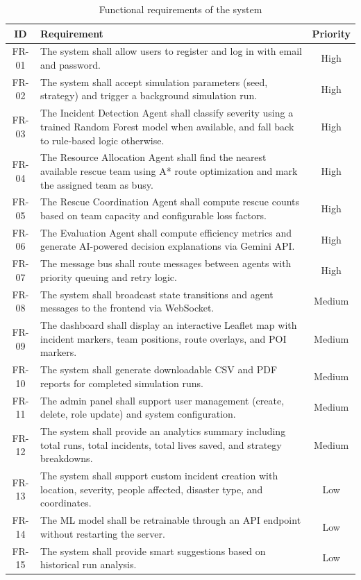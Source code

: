 \begin{table}[H]
\centering
\caption{Functional requirements of the system}
\label{tab:functional_req}
\begin{tabularx}{\textwidth}{|c|X|c|}
\hline
\textbf{ID} & \textbf{Requirement} & \textbf{Priority} \\
\hline
FR-01 & The system shall allow users to register and log in with email and password. & High \\
\hline
FR-02 & The system shall accept simulation parameters (seed, strategy) and trigger a background simulation run. & High \\
\hline
FR-03 & The Incident Detection Agent shall classify severity using a trained Random Forest model when available, and fall back to rule-based logic otherwise. & High \\
\hline
FR-04 & The Resource Allocation Agent shall find the nearest available rescue team using A* route optimization and mark the assigned team as busy. & High \\
\hline
FR-05 & The Rescue Coordination Agent shall compute rescue counts based on team capacity and configurable loss factors. & High \\
\hline
FR-06 & The Evaluation Agent shall compute efficiency metrics and generate AI-powered decision explanations via Gemini API. & High \\
\hline
FR-07 & The message bus shall route messages between agents with priority queuing and retry logic. & High \\
\hline
FR-08 & The system shall broadcast state transitions and agent messages to the frontend via WebSocket. & Medium \\
\hline
FR-09 & The dashboard shall display an interactive Leaflet map with incident markers, team positions, route overlays, and POI markers. & Medium \\
\hline
FR-10 & The system shall generate downloadable CSV and PDF reports for completed simulation runs. & Medium \\
\hline
FR-11 & The admin panel shall support user management (create, delete, role update) and system configuration. & Medium \\
\hline
FR-12 & The system shall provide an analytics summary including total runs, total incidents, total lives saved, and strategy breakdowns. & Medium \\
\hline
FR-13 & The system shall support custom incident creation with location, severity, people affected, disaster type, and coordinates. & Low \\
\hline
FR-14 & The ML model shall be retrainable through an API endpoint without restarting the server. & Low \\
\hline
FR-15 & The system shall provide smart suggestions based on historical run analysis. & Low \\
\hline
\end{tabularx}
\end{table}

